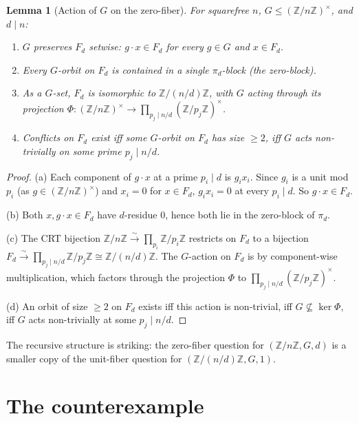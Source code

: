 \documentclass[11pt,reqno]{amsart}
\theoremstyle{plain}
\newtheorem{lemma}[theorem]{Lemma}
\theoremstyle{definition}
\newcommand{\Z}{\mathbb{Z}}
\newcommand{\Zn}{\Z/n\Z}
\newcommand{\Zns}{(\Z/n\Z)^{\times}}
\begin{document}
\begin{lemma}[Action of $G$ on the zero-fiber] \label{lem:zerofiber}
For squarefree $n$, $G \leq \Zns$, and $d \mid n$:
\begin{enumerate}[label=\textup{(\alph*)}]
\item $G$ preserves $F_d$ setwise: $g \cdot x \in F_d$ for every $g \in G$ and $x \in F_d$.
\item Every $G$-orbit on $F_d$ is contained in a single $\pi_d$-block (the zero-block).
\item As a $G$-set, $F_d$ is isomorphic to $\Z/(n/d)\Z$, with $G$ acting through its projection $\Phi \colon \Zns \to \prod_{p_j \mid n/d} (\Z/p_j\Z)^{\times}$.
\item Conflicts on $F_d$ exist iff some $G$-orbit on $F_d$ has size $\geq 2$, iff $G$ acts non-trivially on some prime $p_j \mid n/d$.
\end{enumerate}
\end{lemma}

\begin{proof}
(a) Each component of $g \cdot x$ at a prime $p_i \mid d$ is $g_i x_i$. Since $g_i$ is a unit mod $p_i$ (as $g \in \Zns$) and $x_i = 0$ for $x \in F_d$, $g_i x_i = 0$ at every $p_i \mid d$. So $g \cdot x \in F_d$.

(b) Both $x, g \cdot x \in F_d$ have $d$-residue $0$, hence both lie in the zero-block of $\pi_d$.

(c) The CRT bijection $\Zn \xrightarrow{\sim} \prod_{p_i} \Z/p_i\Z$ restricts on $F_d$ to a bijection $F_d \xrightarrow{\sim} \prod_{p_j \mid n/d} \Z/p_j\Z \cong \Z/(n/d)\Z$. The $G$-action on $F_d$ is by component-wise multiplication, which factors through the projection $\Phi$ to $\prod_{p_j \mid n/d} (\Z/p_j\Z)^{\times}$.

(d) An orbit of size $\geq 2$ on $F_d$ exists iff this action is non-trivial, iff $G \not\subseteq \ker \Phi$, iff $G$ acts non-trivially at some $p_j \mid n/d$.
\end{proof}

The recursive structure is striking: the zero-fiber question for $(\Zn, G, d)$ is a smaller copy of the unit-fiber question for $(\Z/(n/d)\Z, G, 1)$.

\section{The counterexample}
\end{document}
